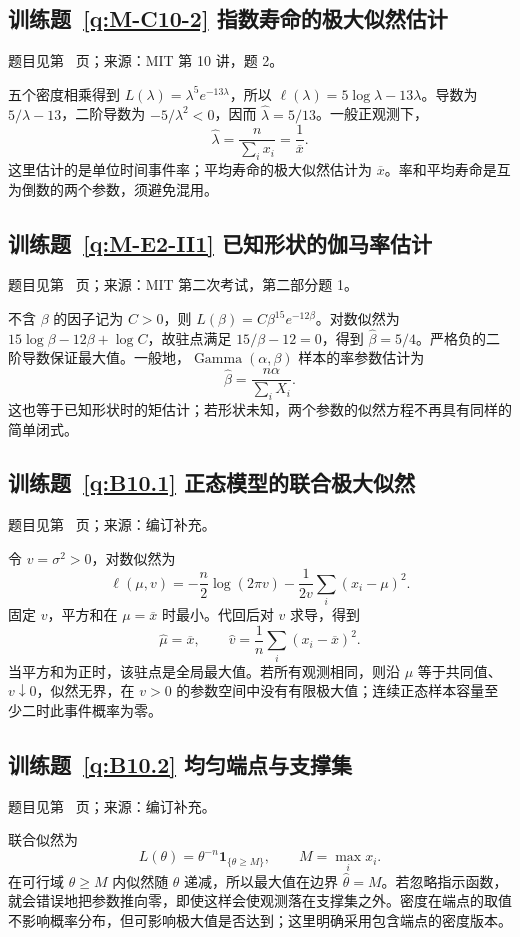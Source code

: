 \documentclass[UTF8,12pt,a4paper,fontset=fandol]{ctexbook}
\begin{document}
\subsection*{训练题~\ref{q:M-C10-2} 指数寿命的极大似然估计}\label{a:M-C10-2}{\small 题目见第~\pageref{q:M-C10-2} 页；来源：MIT 第 10 讲，题 2。}
\begin{solve}五个密度相乘得到 $L(\lambda)=\lambda^5e^{-13\lambda}$，所以 $\ell(\lambda)=5\log\lambda-13\lambda$。导数为 $5/\lambda-13$，二阶导数为 $-5/\lambda^2<0$，因而 $\widehat\lambda=5/13$。一般正观测下，\[\widehat\lambda=\frac{n}{\sum_i x_i}=\frac1{\overline x}.\]这里估计的是单位时间事件率；平均寿命的极大似然估计为 $\overline x$。率和平均寿命是互为倒数的两个参数，须避免混用。\end{solve}

\subsection*{训练题~\ref{q:M-E2-II1} 已知形状的伽马率估计}\label{a:M-E2-II1}{\small 题目见第~\pageref{q:M-E2-II1} 页；来源：MIT 第二次考试，第二部分题 1。}
\begin{solve}不含 $\beta$ 的因子记为 $C>0$，则 $L(\beta)=C\beta^{15}e^{-12\beta}$。对数似然为 $15\log\beta-12\beta+\log C$，故驻点满足 $15/\beta-12=0$，得到 $\widehat\beta=5/4$。严格负的二阶导数保证最大值。一般地，$\operatorname{Gamma}(\alpha,\beta)$ 样本的率参数估计为\[\widehat\beta=\frac{n\alpha}{\sum_iX_i}.\]这也等于已知形状时的矩估计；若形状未知，两个参数的似然方程不再具有同样的简单闭式。\end{solve}

\subsection*{训练题~\ref{q:B10.1} 正态模型的联合极大似然}\label{a:B10.1}{\small 题目见第~\pageref{q:B10.1} 页；来源：编订补充。}
\begin{solve}令 $v=\sigma^2>0$，对数似然为\[\ell(\mu,v)=-\frac n2\log(2\pi v)-\frac{1}{2v}\sum_i(x_i-\mu)^2.\]固定 $v$，平方和在 $\mu=\overline x$ 时最小。代回后对 $v$ 求导，得到\[\widehat\mu=\overline x,\qquad\widehat v=\frac1n\sum_i(x_i-\overline x)^2.\]当平方和为正时，该驻点是全局最大值。若所有观测相同，则沿 $\mu$ 等于共同值、$v\downarrow0$，似然无界，在 $v>0$ 的参数空间中没有有限极大值；连续正态样本容量至少二时此事件概率为零。\end{solve}

\subsection*{训练题~\ref{q:B10.2} 均匀端点与支撑集}\label{a:B10.2}{\small 题目见第~\pageref{q:B10.2} 页；来源：编订补充。}
\begin{solve}联合似然为\[L(\theta)=\theta^{-n}\mathbf1_{\{\theta\ge M\}},\qquad M=\max_i x_i.\]在可行域 $\theta\ge M$ 内似然随 $\theta$ 递减，所以最大值在边界 $\widehat\theta=M$。若忽略指示函数，就会错误地把参数推向零，即使这样会使观测落在支撑集之外。密度在端点的取值不影响概率分布，但可影响极大值是否达到；这里明确采用包含端点的密度版本。\end{solve}
\end{document}
